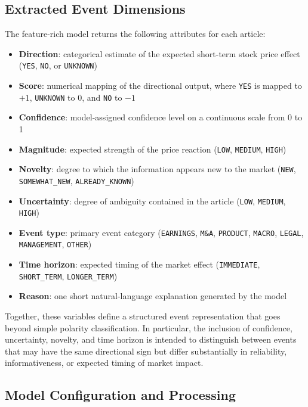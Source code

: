 \subsection{Extracted Event Dimensions}

The feature-rich model returns the following attributes for each article:

\begin{itemize}
    \item \textbf{Direction}: categorical estimate of the expected short-term stock price effect (\texttt{YES}, \texttt{NO}, or \texttt{UNKNOWN})
    \item \textbf{Score}: numerical mapping of the directional output, where \texttt{YES} is mapped to \(+1\), \texttt{UNKNOWN} to \(0\), and \texttt{NO} to \(-1\)
    \item \textbf{Confidence}: model-assigned confidence level on a continuous scale from 0 to 1
    \item \textbf{Magnitude}: expected strength of the price reaction (\texttt{LOW}, \texttt{MEDIUM}, \texttt{HIGH})
    \item \textbf{Novelty}: degree to which the information appears new to the market (\texttt{NEW}, \texttt{SOMEWHAT\_NEW}, \texttt{ALREADY\_KNOWN})
    \item \textbf{Uncertainty}: degree of ambiguity contained in the article (\texttt{LOW}, \texttt{MEDIUM}, \texttt{HIGH})
    \item \textbf{Event type}: primary event category (\texttt{EARNINGS}, \texttt{M\&A}, \texttt{PRODUCT}, \texttt{MACRO}, \texttt{LEGAL}, \texttt{MANAGEMENT}, \texttt{OTHER})
    \item \textbf{Time horizon}: expected timing of the market effect (\texttt{IMMEDIATE}, \texttt{SHORT\_TERM}, \texttt{LONGER\_TERM})
    \item \textbf{Reason}: one short natural-language explanation generated by the model
\end{itemize}

Together, these variables define a structured event representation that goes beyond simple polarity classification. In particular, the inclusion of confidence, uncertainty, novelty, and time horizon is intended to distinguish between events that may have the same directional sign but differ substantially in reliability, informativeness, or expected timing of market impact.

\subsection{Model Configuration and Processing}

